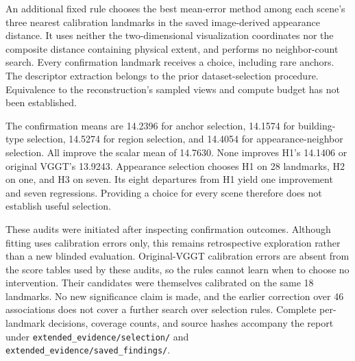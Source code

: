 An additional fixed rule chooses the best mean-error method among each scene's three nearest calibration landmarks in the saved image-derived appearance distance. It uses neither the two-dimensional visualization coordinates nor the composite distance containing physical extent, and performs no neighbor-count search. Every confirmation landmark receives a choice, including rare anchors. The descriptor extraction belongs to the prior dataset-selection procedure. Equivalence to the reconstruction's sampled views and compute budget has not been established.

The confirmation means are 14.2396 for anchor selection, 14.1574 for building-type selection, 14.5274 for region selection, and 14.4054 for appearance-neighbor selection. All improve the scalar mean of 14.7630. None improves H1's 14.1406 or original VGGT's 13.9243. Appearance selection chooses H1 on 28 landmarks, H2 on one, and H3 on seven. Its eight departures from H1 yield one improvement and seven regressions. Providing a choice for every scene therefore does not establish useful selection.

These audits were initiated after inspecting confirmation outcomes. Although fitting uses calibration errors only, this remains retrospective exploration rather than a new blinded evaluation. Original-VGGT calibration errors are absent from the score tables used by these audits, so the rules cannot learn when to choose no intervention. Their candidates were themselves calibrated on the same 18 landmarks. No new significance claim is made, and the earlier correction over 46 associations does not cover a further search over selection rules. Complete per-landmark decisions, coverage counts, and source hashes accompany the report under \nolinkurl{extended_evidence/selection/} and \nolinkurl{extended_evidence/saved_findings/}.
